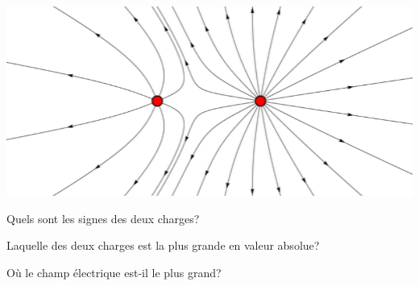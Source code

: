 \begin{diapobox}

  \begin{center}
  \includegraphics[scale=0.5]{02-champ-electrique/figures/efield-ex0.png}
  \end{center}

  Quels sont les signes des deux charges?

  Laquelle des deux charges est la plus grande en valeur absolue?

  Où le champ électrique est-il le plus grand?
\end{diapobox}



